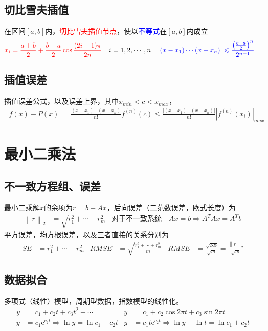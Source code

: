 \documentclass[twocolumn]{article}
\begin{document}
\subsection{切比雪夫插值}
在区间$[a,b]$内，\textcolor{red}{切比雪夫插值节点}，使以\textcolor{blue}{不等式}在$[a,b]$内成立
\begin{align*}
    &\textcolor{red}{x_i=\frac{a+b}{2}+\frac{b-a}{2}\cos{\frac{(2i-1)\pi}{2n}}} & i&=1,2,\cdots,n&    &\textcolor{blue}{\left| (x-x_1)\cdots(x-x_n) \right|\leqslant \frac{\left( \frac{b-a}{2} \right)^n}{2^{n-1}}}
\end{align*}

\subsection{插值误差}
插值误差公式，以及误差上界，其中$x_{min}<c<x_{max}$，
\begin{align*}
    \left| f(x)-P(x) \right|=\frac{(x-x_1)\cdots(x-x_n)}{n!}f^{(n)}(c)  \leqslant\frac{\left| (x-x_1)\cdots(x-x_n) \right|}{n!}\left| f^{(n)}(x_i) \right|_{max}
\end{align*}

\section{最小二乘法}

\subsection{不一致方程组、误差}
最小二乘解$\bar{x}$的余项为$r=b-A\bar{x}$，后向误差（二范数误差，欧式长度）为
\begin{align*}
    \left\| r \right\|_2&=\sqrt{r_1^2+\cdots+r_m^2} &\text{对于不一致系统}\quad Ax=b\Rightarrow A^TA\bar{x}=A^Tb
\end{align*}
平方误差，均方根误差，以及三者直接的关系分别为
\begin{align*}
    SE & =r_1^2+\cdots+r_m^2 & RMSE & =\sqrt{\frac{r_1^2+\cdots+r_m^2}{m}} & RMSE & =\frac{\sqrt{SE}}{\sqrt{m}}=\frac{\left\| r \right\|_2}{\sqrt{m}}
\end{align*}

\subsection{数据拟合}
多项式（线性）模型，周期型数据，指数模型的线性化。
\begin{align*}
    y & =c_1+c_2t+c_3t^2+\cdots                                & y & =c_1+c_2\cos{2\pi t}+c_3\sin{2\pi t}                           \\
    y & =c_1\mathrm{e}^{c_2t} \Rightarrow \ln{y}=\ln{c_1}+c_2t & y & =c_1t\mathrm{e}^{c_2t} \Rightarrow \ln{y}-\ln{t}=\ln{c_1}+c_2t
\end{align*}
\end{document}
